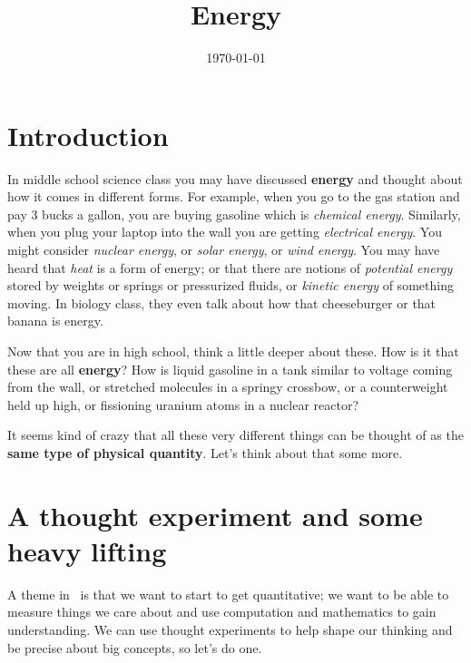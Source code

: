 \documentclass[handout]{tufte-handout}
\title{Energy}
\date{\today}
\author{\mobeardInstructorShort}
\begin{document}
\maketitle
{}

\section{Introduction}
In middle school science class you may have discussed \textbf{energy} and thought about how it comes in different forms. For example, when you go to the gas station and pay 3 bucks a gallon, you are buying gasoline which is \emph{chemical energy}. Similarly, when you plug your laptop into the wall you are getting \emph{electrical energy}. You might consider \emph{nuclear energy}, or \emph{solar energy}, or \emph{wind energy}. You may have heard that \emph{heat} is a form of energy; or that there are notions of \emph{potential energy} stored by weights or springs or pressurized fluids, or \emph{kinetic energy} of something moving. In biology class, they even talk about how that cheeseburger or that banana is energy. 

Now that you are in high school, think a little deeper about these. How is it that these are all \textbf{energy}? How is liquid gasoline in a tank similar to voltage coming from the wall, or stretched molecules in a springy crossbow, or a counterweight held up high, or fissioning uranium atoms in a nuclear reactor? 

It seems kind of crazy that all these very different things can be thought of as the \textbf{same type of physical quantity}. Let's think about that some more. 

\section{A thought experiment and some heavy lifting}
A theme in \mobeardCourseName\ is that we want to start to get quantitative; we want to be able to measure things we care about and use computation and mathematics to gain understanding. We can use thought experiments to help shape our thinking and be precise about big concepts, so let's do one. 
\end{document}
